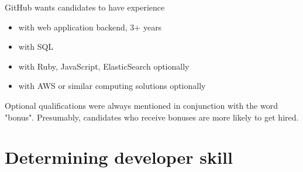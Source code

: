 GitHub wants candidates to have experience
\begin{itemize}
    \item with web application backend, 3+ years
    \item with SQL
    \item with Ruby, JavaScript, ElasticSearch optionally
    \item with AWS or similar computing solutions optionally
\end{itemize}

Optional qualifications were always mentioned in conjunction with the
word "bonus". Presumably, candidates who receive bonuses are more
likely to get hired.


\section{Determining developer skill}